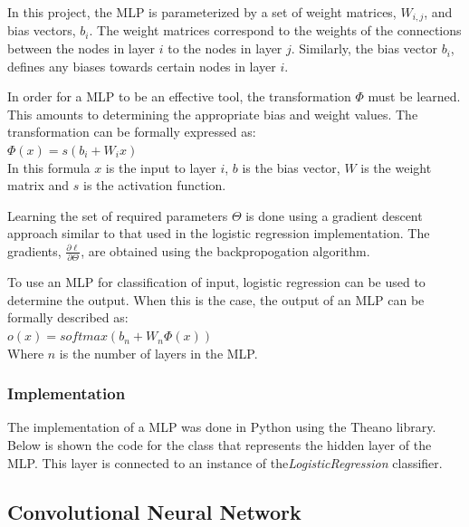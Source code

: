 \documentclass[12pt, titlepage]{article}
\begin{document}
  In this project, the MLP is parameterized by a set of weight matrices, $W_{i,j}$, and bias vectors, $b_{i}$. The weight
  matrices correspond to the weights of the connections between the nodes in layer $i$ to the nodes in layer $j$. Similarly,
  the bias vector $b_{i}$, defines any biases towards certain nodes in layer $i$.
  
  In order for a MLP to be an effective tool, the transformation $\Phi$ must be learned. This amounts to determining the
  appropriate bias and weight values. The transformation can be formally expressed as: \\
  \vspace{1mm}
  \hspace{7mm}$\Phi(x) = s(b_{i} + W_{i}x)$ \\
  In this formula $x$ is the input to layer $i$, $b$ is the bias vector, $W$ is the weight matrix and $s$ is the activation
  function.
  
  Learning the set of required parameters $\Theta$ is done using a gradient descent approach similar to that used in the
  logistic regression implementation. The gradients, $\frac{\partial \ell}{\partial \Theta}$, are obtained using the
  backpropogation algorithm.
  
  To use an MLP for classification of input, logistic regression can be used to determine the output. When this is the case,
  the output of an MLP can be formally described as: \\
  \vspace{1mm}
  \hspace{7mm}$o(x) = softmax(b_{n} + W_{n} \Phi(x))$ \\
  Where $n$ is the number of layers in the MLP.
  
  \subsubsection{Implementation}
  
  The implementation of a MLP was done in Python using the Theano library. Below is shown the code for the class that
  represents the hidden layer of the MLP. This layer is connected to an instance of the\textit{LogisticRegression} classifier.
    

\subsection{Convolutional Neural Network}
\end{document}
